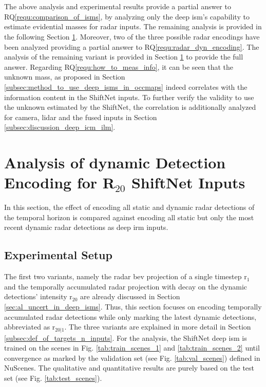 \\\\
The above analysis and experimental results provide a partial answer to RQ\ref{requ:comparison_of_isms}, by analyzing only the deep \gls{ism}'s capability to estimate evidential masses for radar inputs. The remaining analysis is provided in the following Section \ref{sec:analysis_dyn_encoding}. Moreover, two of the three possible radar encodings have been analyzed providing a partial answer to RQ\ref{requ:radar_dyn_encoding}. The analysis of the remaining variant is provided in Section \ref{sec:analysis_dyn_encoding} to provide the full answer. Regarding RQ\ref{requ:how_to_meas_info}, it can be seen that the unknown mass, as proposed in Section \ref{subsec:method_to_use_deep_isms_in_occmaps} indeed correlates with the information content in the ShiftNet inputs. To further verify the validity to use the unknown estimated by the ShiftNet, the correlation is additionally analyzed for camera, lidar and the fused inputs in Section \ref{subsec:discussion_deep_icm_ilm}.
%
\section{Analysis of dynamic Detection Encoding for R$_{20}$ ShiftNet Inputs}
\label{sec:analysis_dyn_encoding}
In this section, the effect of encoding all static and dynamic radar detections of the temporal horizon is compared against encoding all static but only the most recent dynamic radar detections as deep \gls{irm} inputs. 
%
\subsection{Experimental Setup}
The first two variants, namely the radar \gls{bev} projection of a single timestep \gls{r}$_1$ and the temporally accumulated radar projection with decay on the dynamic detections' intensity \gls{r}$_{20}$ are already discussed in Section \ref{sec:al_uncert_in_deep_isms}. Thus, this section focuses on encoding temporally accumulated radar detections while only marking the latest dynamic detections, abbreviated as \gls{r}$_{20|1}$. The three variants are explained in more detail in Section \ref{subsec:def_of_targets_n_inputs}. For the analysis, the ShiftNet deep \gls{ism} is trained on the scenes in Fig. \ref{tab:train_scenes_1} and \ref{tab:train_scenes_2} until convergence as marked by the validation set (see Fig. \ref{tab:val_scenes}) defined in NuScenes. The qualitative and quantitative results are purely based on the test set (see Fig. \ref{tab:test_scenes}).
%
